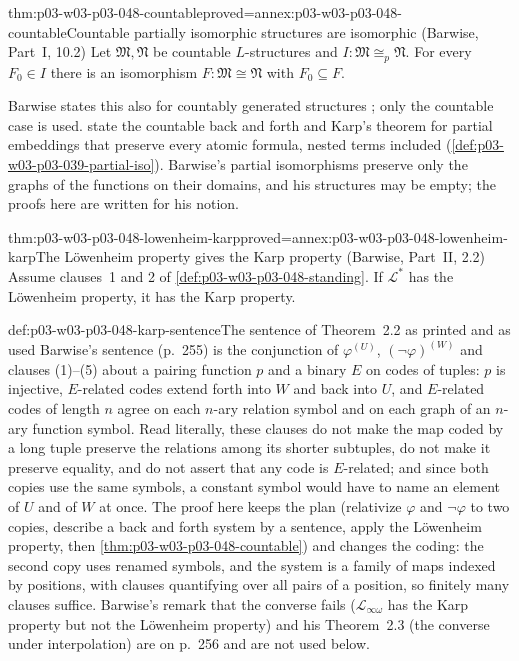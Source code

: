 \begin{hblemma}{thm:p03-w03-p03-048-countable}{proved=annex:p03-w03-p03-048-countable}{Countable partially isomorphic structures are isomorphic (Barwise, Part~I, 10.2)}
Let \(\mathfrak M,\mathfrak N\) be countable \(L\)-structures and
\(I:\mathfrak M\cong_{p}\mathfrak N\).  For every \(F_0\in I\) there is an
isomorphism \(F:\mathfrak M\cong\mathfrak N\) with \(F_0\subseteq F\).
\end{hblemma}

Barwise states this also for countably generated structures
\cite[Part~I, \S10, 10.2, p.~244]{Barwise1974Axioms}; only the countable
case is used.  
state the countable back and forth and Karp's theorem for partial embeddings
that preserve every atomic formula, nested terms included
(\cref{def:p03-w03-p03-039-partial-iso}).  Barwise's partial isomorphisms
preserve only the graphs of the functions on their domains, and his
structures may be empty; the proofs here are written for his notion.

\begin{hbtheorem}{thm:p03-w03-p03-048-lowenheim-karp}{proved=annex:p03-w03-p03-048-lowenheim-karp}{The L\"owenheim property gives the Karp property (Barwise, Part~II, 2.2)}
Assume clauses~1 and 2 of \cref{def:p03-w03-p03-048-standing}.  If
\(\mathcal L^{\ast}\) has the L\"owenheim property, it has the Karp
property.
\end{hbtheorem}

\begin{hbwarning}{def:p03-w03-p03-048-karp-sentence}{The sentence of Theorem~2.2 as printed and as used}
Barwise's sentence (p.~255) is the conjunction of \(\varphi^{(U)}\),
\((\neg\varphi)^{(W)}\) and clauses (1)--(5) about a pairing function
\(p\) and a binary \(E\) on codes of tuples: \(p\) is injective,
\(E\)-related codes extend forth into \(W\) and back into \(U\), and
\(E\)-related codes of length \(n\) agree on each \(n\)-ary relation symbol
and on each graph of an \(n\)-ary function symbol.  Read literally, these
clauses do not make the map coded by a long tuple preserve the relations
among its shorter subtuples, do not make it preserve equality, and do not
assert that any code is \(E\)-related; and since both copies use the same
symbols, a constant symbol would have to name an element of \(U\) and of
\(W\) at once.  The proof here keeps the plan (relativize \(\varphi\) and
\(\neg\varphi\) to two copies, describe a back and forth system by a
sentence, apply the L\"owenheim property, then
\cref{thm:p03-w03-p03-048-countable}) and changes the coding: the second
copy uses renamed symbols, and the system is a family of maps indexed by
positions, with clauses quantifying over all pairs of a position, so
finitely many clauses suffice.  Barwise's remark that the converse fails
(\(\mathcal L_{\infty\omega}\) has the Karp property but not the
L\"owenheim property) and his Theorem~2.3 (the converse under
interpolation) are on p.~256 and are not used below.
\end{hbwarning}

